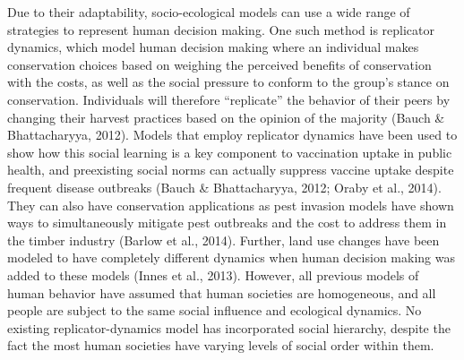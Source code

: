 \documentclass[
  12pt,
]{article}
\begin{document}
Due to their adaptability, socio-ecological models can use a wide range of strategies to represent human decision making. One such method is replicator dynamics, which model human decision making where an individual makes conservation choices based on weighing the perceived benefits of conservation with the costs, as well as the social pressure to conform to the group's stance on conservation. Individuals will therefore ``replicate'' the behavior of their peers by changing their harvest practices based on the opinion of the majority (Bauch \& Bhattacharyya, 2012). Models that employ replicator dynamics have been used to show how this social learning is a key component to vaccination uptake in public health, and preexisting social norms can actually suppress vaccine uptake despite frequent disease outbreaks (Bauch \& Bhattacharyya, 2012; Oraby et al., 2014). They can also have conservation applications as pest invasion models have shown ways to simultaneously mitigate pest outbreaks and the cost to address them in the timber industry (Barlow et al., 2014). Further, land use changes have been modeled to have completely different dynamics when human decision making was added to these models (Innes et al., 2013). However, all previous models of human behavior have assumed that human societies are homogeneous, and all people are subject to the same social influence and ecological dynamics. No existing replicator-dynamics model has incorporated social hierarchy, despite the fact the most human societies have varying levels of social order within them.
\end{document}
